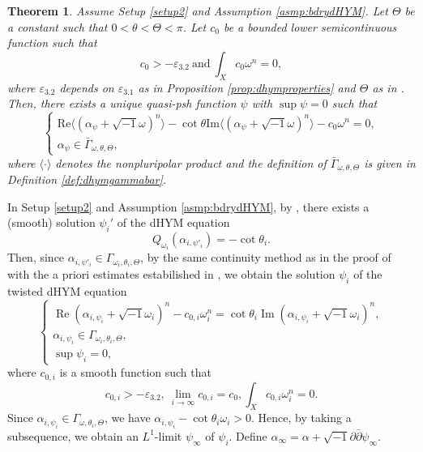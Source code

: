 \documentclass[10pt,a4paper]{amsart}
\numberwithin{equation}{section}
\newtheorem{thm}[equation]{Theorem}
\newcommand{\delb}{\sqrt{-1}\partial\bar{\partial}}
\begin{document}
\begin{thm}\label{thm:tdHYM}
    Assume Setup \ref{setup2} and Assumption \ref{asmp:bdrydHYM}. Let $\Theta$ be a constant such that $0<\theta<\Theta<\pi$. Let $c_0$ be a bounded lower semicontinuous function such that 
    \begin{equation}
        c_0>-\varepsilon_{3.2} \ \text{and} \  \int_X c_0\omega^n=0,
    \end{equation} 
    where $\varepsilon_{3.2}$ depends on $\varepsilon_{3.1}$ as in Proposition \ref{prop:dhymproperties} and $\Theta$ as in \cite[Lemma 5.6 (5)]{GChen}. Then, there exists a unique quasi-psh function $\psi$ with $\sup\psi=0$ such that
    \begin{equation}\label{eq:tdHYM}
        \begin{cases}
            \mathrm{Re}\langle(\alpha_\psi+\sqrt{-1}\omega)^n\rangle-\cot\theta\mathrm{Im}\langle(\alpha_\psi+\sqrt{-1}\omega)^n\rangle-c_0\omega^n=0,\\
            \alpha_\psi\in\bar{\Gamma}_{\omega,\theta,\Theta},
        \end{cases}
    \end{equation}
    where $\langle\cdot\rangle$ denotes the nonpluripolar product and the definition of $\bar{\Gamma}_{\omega,\theta,\Theta}$ is given in Definition \ref{def:dhymgammabar}.
\end{thm}


In Setup \ref{setup2} and Assumption \ref{asmp:bdrydHYM}, by \cite[Theorem 1.3]{CLT}, there exists a (smooth) solution $\psi_i'$ of the dHYM equation 
\begin{equation*}
    Q_{\omega_i}(\alpha_{i,\psi'_i})=-\cot\theta_i.
\end{equation*}
Then, since $\alpha_{i,\psi'_i}\in{\Gamma}_{\omega_i,\theta_i,\Theta}$, by the same continuity method as in the proof of \cite[Proposition 5.5]{GChen} with the a priori estimates estabilished in \cite[Theorem 1.2]{Linb}, 
we obtain the solution $\psi_i$ of the twisted dHYM equation
\begin{equation}\label{eq:appdhym}
    \begin{cases}
        \operatorname{Re}(\alpha_{i,\psi_i}+\sqrt{-1}\omega_i)^n-c_{0,i}\omega_i^n=\cot\theta_i\operatorname{Im}(\alpha_{i,\psi_i}+\sqrt{-1}\omega_i)^n,\\
        \alpha_{i,\psi_i}\in{\Gamma}_{\omega_i,\theta_i,\Theta},\\
        \sup \psi_i=0,
    \end{cases}
    \end{equation}
    where $c_{0,i}$ is a smooth function  such that
    \begin{equation*}
        c_{0,i}>-\varepsilon_{3.2}, \  \lim_{i\to\infty} c_{0,i}=c_0,\int_X c_{0,i}\omega_i^n=0.
    \end{equation*}
Since $\alpha_{i,\psi_i}\in{\Gamma}_{\omega,\theta_i,\Theta}$, we have $\alpha_{i,\psi_i}-\cot\theta_i\omega_i>0$. Hence, by taking a subsequence, we obtain an $L^1$-limit $\psi_\infty$ of $\psi_i$. Define $\alpha_\infty=\alpha+\delb \psi_\infty$.
\end{document}
